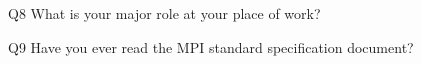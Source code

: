 \begin{description}%
\item{Q8} What is your major role at your place of work?%
\item{Q9} Have you ever read the MPI standard specification document?%
\end{description}%
